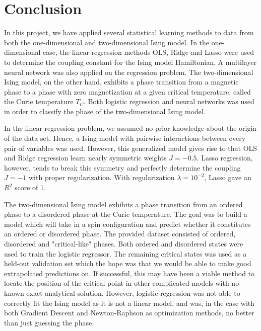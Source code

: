 \section{Conclusion}\label{sec:Conclusion}

In this project, we have applied several statistical learning methods to data from both the one-dimensional and two-dimensional Ising model. In the one-dimensional case, the linear regression methods OLS, Ridge and Lasso were used to determine the coupling constant for the Ising model Hamiltonian. A multilayer neural network was also applied on the regression problem. The two-dimensional Ising model, on the other hand, exhibits a phase transition from a magnetic phase to a phase with zero magnetization at a given critical temperature, called the Curie temperature $T_C$. Both logistic regression and neural networks was used in order to classify the phase of the two-dimensional Ising model. 

In the linear regression problem, we assumed no prior knowledge about the origin of the data set. Hence, a Ising model with pairwise interactions between every pair of variables was used. However, this generalized model gives rise to that OLS and Ridge regression learn nearly symmetric weights $J=-0.5$. Lasso regression, however, tends to break this symmetry and perfectly determine the coupling $J=-1$ with proper regularization. With regularization $\lambda = 10^{-2}$, Lasso gave an $R^2$ score of 1. 

The two-dimensional Ising model exhibits a phase transition from an ordered phase to a disordered phase at the Curie temperature. The goal was to build a model which will take in a spin configuration and predict whether it constitutes an ordered or disordered phase. The provided dataset consisted of ordered, disordered and "critical-like" phases. Both ordered and disordered states were used to train the logistic regressor. The remaining critical states was used as a held-out validation set which the hope was that we would be able to make good extrapolated predictions on. If successful, this may have been a viable method to locate the position of the critical point in other complicated models with no known exact analytical solution. However, logistic regression was not able to correctly fit the Ising model as it is not a linear model, and was, in the case with both Gradient Descent and Newton-Raphson as optimization methods, no better than just guessing the phase.

